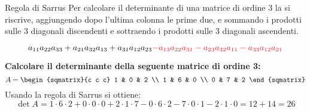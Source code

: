 \begin{teo}{Regola di Sarrus}
    Per calcolare il determinante di una matrice di ordine 3 la si riscrive, aggiungendo dopo l'ultima colonna le prime due, e sommando i prodotti sulle 3 diagonali discendenti e sottraendo i prodotti sulle 3 diagonali ascendenti.
    \begin{center}
        \tikzset{external/export=true}
        \tikzset{external/export=false}
    \end{center}
    \[
        a_{11}a_{22}a_{33} + a_{21}a_{32}a_{13} + a_{31}a_{12}a_{23} \textcolor{Red}{- a_{13}a_{22}a_{31} - a_{23}a_{32}a_{11} - a_{33}a_{12}a_{21}}
    \]
\end{teo}
\begin{esempio}
    \textbf{Calcolare il determinante della seguente matrice di ordine 3:}
    \[
        A =
        \begin{sqmatrix}{c c c}
            1 & 0 & 2 \\
            1 & 6 & 0 \\
            0 & 7 & 2
        \end{sqmatrix}
    \]
    Usando la regola di Sarrus si ottiene:
    \[
        \det A = 1 \cdot 6 \cdot 2 + 0 \cdot 0 \cdot 0 + 2 \cdot 1 \cdot 7 - 0 \cdot 6 \cdot 2 - 7 \cdot 0 \cdot 1 - 2 \cdot 1 \cdot 0 = 12 + 14 = 26
    \]
\end{esempio}
